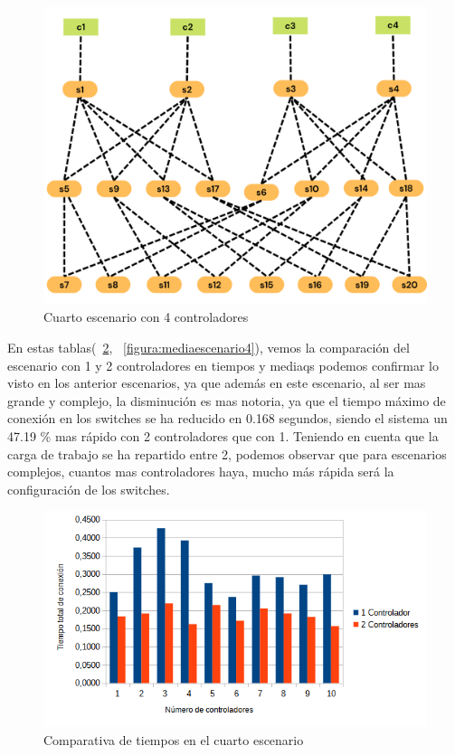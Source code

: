 \documentclass[a4paper, 12pt]{book}
\begin{document}
	
	\begin{figure}[H]
		\centering
		\includegraphics[width=13cm, keepaspectratio]{img/e4_3}
		\caption{Cuarto escenario con 4 controladores}
		\label{figura:e4_3}
	\end{figure}
	
En estas tablas(~\ref{figura:comparativaescenario4}, ~\ref{figura:mediaescenario4}), vemos la comparación del escenario con 1 y 2 controladores en tiempos y mediaqs podemos confirmar lo visto en los anterior escenarios, ya que además en este escenario, al ser mas grande y complejo, la disminución es mas notoria, ya que el tiempo máximo de conexión en los switches se ha reducido en 0.168 segundos, siendo el sistema un 47.19 \% mas rápido con 2 controladores que con 1. Teniendo en cuenta que la carga de trabajo se ha repartido entre 2, podemos observar que para escenarios complejos, cuantos mas controladores haya, mucho más rápida será la configuración de los switches.
		
		
	
	\begin{figure}[H]
		\centering
		\includegraphics[width=13cm, keepaspectratio]{img/comparativaescenario4}
		\caption{Comparativa de tiempos en el cuarto escenario}
		\label{figura:comparativaescenario4}
	\end{figure}
	
\end{document}
